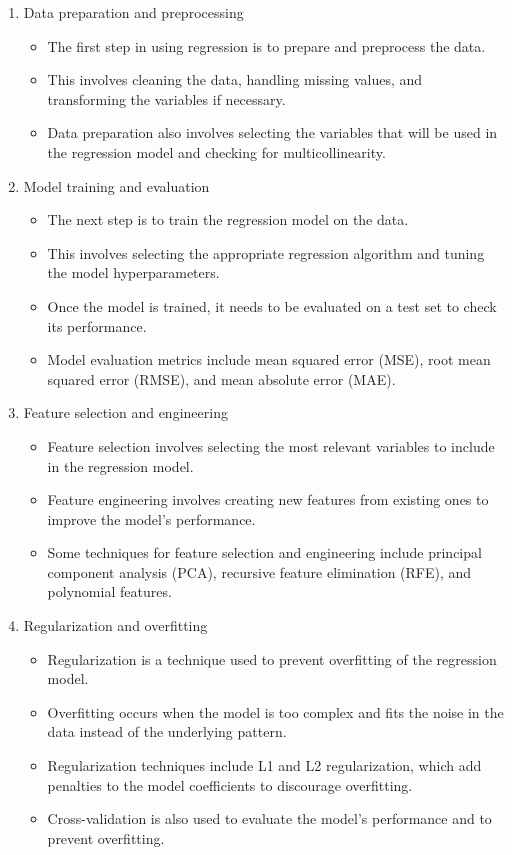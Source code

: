 \documentclass{article}
\begin{document}
\begin{enumerate}[label=\alph*)]
\item Data preparation and preprocessing
\begin{itemize}
\item The first step in using regression is to prepare and preprocess the data.
\item This involves cleaning the data, handling missing values, and transforming the variables if necessary.
\item Data preparation also involves selecting the variables that will be used in the regression model and checking for multicollinearity.
\end{itemize}

\item Model training and evaluation
\begin{itemize}
\item The next step is to train the regression model on the data.
\item This involves selecting the appropriate regression algorithm and tuning the model hyperparameters.
\item Once the model is trained, it needs to be evaluated on a test set to check its performance.
\item Model evaluation metrics include mean squared error (MSE), root mean squared error (RMSE), and mean absolute error (MAE).
\end{itemize}

\item Feature selection and engineering
\begin{itemize}
\item Feature selection involves selecting the most relevant variables to include in the regression model.
\item Feature engineering involves creating new features from existing ones to improve the model's performance.
\item Some techniques for feature selection and engineering include principal component analysis (PCA), recursive feature elimination (RFE), and polynomial features.
\end{itemize}

\item Regularization and overfitting
\begin{itemize}
\item Regularization is a technique used to prevent overfitting of the regression model.
\item Overfitting occurs when the model is too complex and fits the noise in the data instead of the underlying pattern.
\item Regularization techniques include L1 and L2 regularization, which add penalties to the model coefficients to discourage overfitting.
\item Cross-validation is also used to evaluate the model's performance and to prevent overfitting.
\end{itemize}


\end{enumerate}
\end{document}
